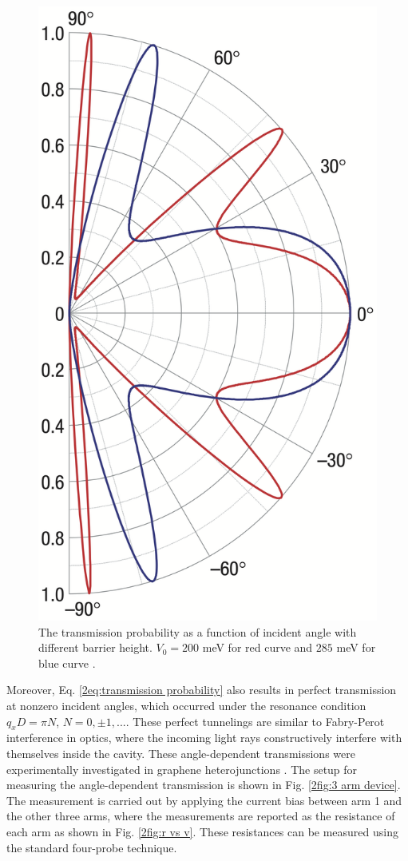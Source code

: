     \begin{figure}[H]
        \centering
        \includegraphics[width = 0.3\linewidth]{fig/Chap 2/klein tunneling.png}
        \caption{The transmission probability as a function of incident angle with different barrier height. 
                    $V_0 = 200$ meV for red curve and $285$ meV for blue curve \cite{Katsnelson2006a}.}
        \label{2fig:Klein tunneling}
    \end{figure}
    Moreover, Eq. \ref{2eq:transmission probability} also results in perfect transmission at nonzero incident angles, which occurred under the resonance condition $q_x D = \pi N$, $N = 0, \pm 1,...$.
    These perfect tunnelings are similar to Fabry-Perot interference in optics, where the incoming light rays constructively interfere with themselves inside the cavity.
    These angle-dependent transmissions were experimentally investigated in graphene heterojunctions \cite{Rahman2015}.
    The setup for measuring the angle-dependent transmission is shown in Fig. \ref{2fig:3 arm device}.
    The measurement is carried out by applying the current bias between arm 1 and the other three arms, where the measurements are reported as the resistance of each arm as shown in Fig. \ref{2fig:r vs v}.
    These resistances can be measured using the standard four-probe technique.
